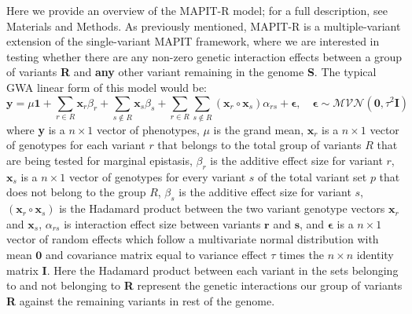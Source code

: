 \documentclass[12pt,a4paper]{article}
\begin{document}
Here we provide an overview of the MAPIT-R model; for a full description, see Materials and Methods. As previously mentioned, MAPIT-R is a multiple-variant extension of the single-variant MAPIT framework, where we are interested in testing whether there are any non-zero genetic interaction effects between a group of variants \textbf{R} and \textbf{any} other variant remaining in the genome \textbf{S}. The typical GWA linear form of this model would be:  
\begin{equation}\label{Overview1}
\textbf{y} = \mu\textbf{1} + \sum_{r \in R} \textbf{x}_r\beta_r + \sum_{s \not\in R} \textbf{x}_s\beta_s + \sum_{r \in R}\sum_{s \not\in R} (\textbf{x}_r \circ \textbf{x}_s)\alpha_{rs} + \boldsymbol{\epsilon}, \quad \boldsymbol{\epsilon} \sim \mathcal{MVN}(\textbf{0}, \tau^{2}\textbf{I})  
\end{equation}
where \textbf{y} is a $n \times 1$ vector of phenotypes, $\mu$ is the grand mean, $\textbf{x}_r$ is a $n \times 1$ vector of genotypes for each variant $r$ that belongs to the total group of variants $R$ that are being tested for marginal epistasis, $\beta_r$ is the additive effect size for variant $r$, $\textbf{x}_s$ is a $n \times 1$ vector of genotypes for every variant $s$ of the total variant set $p$ that does not belong to the group $R$, $\beta_s$ is the additive effect size for variant $s$, $(\textbf{x}_r \circ \textbf{x}_s)$ is the Hadamard product between the two variant genotype vectors $\textbf{x}_r$ and $\textbf{x}_s$, $\alpha_{rs}$ is interaction effect size between variants $\textbf{r}$ and $\textbf{s}$, and $\boldsymbol{\epsilon}$ is a $n \times 1$ vector of random effects which follow a multivariate normal distribution with mean $\textbf{0}$ and covariance matrix equal to variance effect $\tau$ times the $n \times n$ identity matrix $\textbf{I}$. Here the Hadamard product between each variant in the sets belonging to and not belonging to \textbf{R} represent the genetic interactions our group of variants \textbf{R} against the remaining variants in rest of the genome.
\end{document}
